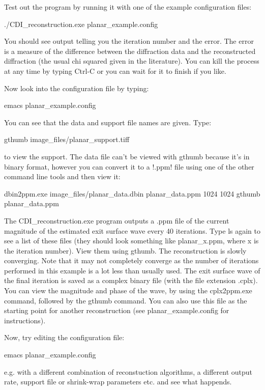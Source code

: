 \documentclass[]{cxs-software}
\begin{document}
Test out the program by running it with one of the example
configuration files: 
\begin{myverbatim}
   ./CDI_reconstruction.exe planar_example.config
\end{myverbatim}
You should see output telling you the iteration number and the
error. The error is a measure of the difference between the
diffraction data and the reconstructed diffraction (the usual chi
squared given in the literature). You can kill the process at any time
by typing Ctrl-C or you can wait for it to finish if you like.

Now look into the configuration file by typing: 
\begin{myverbatim}
   emacs planar_example.config 
\end{myverbatim}
You can see that the data and support file names are given. Type: 
\begin{myverbatim}
   gthumb image_files/planar_support.tiff 
\end{myverbatim}
to view the support. The data file can't be viewed with gthumb because
it's in binary format, however you can convert it to a !.ppm! file using
one of the other command line tools and then view it: 
\begin{myverbatim}
   dbin2ppm.exe image_files/planar_data.dbin planar_data.ppm 1024 1024 
   gthumb planar_data.ppm
\end{myverbatim}

The CDI\_reconstruction.exe program outputs a .ppm file of the current
magnitude of the estimated exit surface wave every 40 iterations. Type
ls again to see a list of these files (they should look something like
planar\_x.ppm, where x is the iteration number). View them using
gthumb. The reconstruction is slowly converging. Note that it may not
completely converge as the number of iterations performed in this
example is a lot less than usually used. The exit surface wave of the
final iteration is saved as a complex binary file (with the file
extension .cplx). You can view the magnitude and phase of the wave, by
using the cplx2ppm.exe command, followed by the gthumb command. You
can also use this file as the starting point for another
reconstruction (see planar\_example.config for instructions).

Now, try editing the configuration file: 
\begin{myverbatim}
   emacs planar_example.config 
\end{myverbatim}
e.g. with a different combination of reconstuction algorithms, a
different output rate, support file or shrink-wrap parameters etc. and
see what happends.
\end{document}
